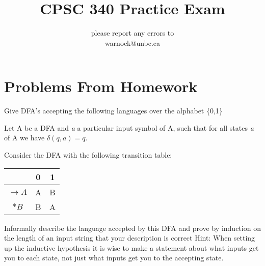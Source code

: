 \documentclass{exam}
\begin{document}
\title{CPSC 340 Practice Exam}
\date{}
\author{please report any errors to\\
warnock@unbc.ca}
\maketitle

\section*{Problems From Homework}
\begin{questions}
  \question
  Give DFA's accepting the following languages over the alphabet \{0,1\}

  \question
  Let A be a DFA and \textit{a} a particular input symbol of A, such
  that for all states \textit{a} of A we have $\delta(q, a) = q$.

  \question
  Consider the DFA with the following transition table:
  \begin{center}
    \begin{tabular}{c|c|c}
      &0&1\\
      \hline
      $\rightarrow A$&A&B\\
      $*B$&B&A
    \end{tabular}
  \end{center}
  Informally describe the language accepted by this DFA and prove by
  induction on the length of an input string that your description is
  correct Hint: When setting up the inductive hypothesis it is wise
  to make a statement about what inputs get you to each state, not just
  what inputs get you to the accepting state.


\end{questions}
\end{document}
